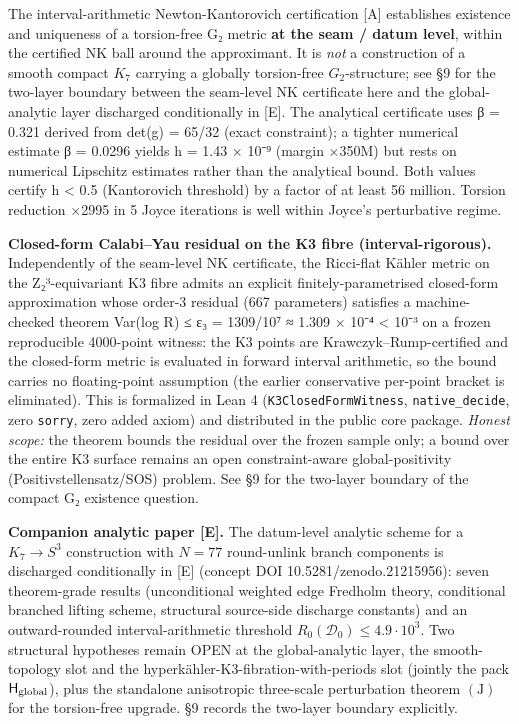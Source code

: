 \documentclass[11pt,a4paper]{article}
\begin{document}
The interval-arithmetic Newton-Kantorovich certification {[}A{]} establishes existence and uniqueness of a torsion-free G₂ metric \textbf{at the seam / datum level}, within the certified NK ball around the approximant. It is \emph{not} a construction of a smooth compact \(K_7\) carrying a globally torsion-free \(G_2\)-structure; see §9 for the two-layer boundary between the seam-level NK certificate here and the global-analytic layer discharged conditionally in {[}E{]}. The analytical certificate uses β = 0.321 derived from det(g) = 65/32 (exact constraint); a tighter numerical estimate β = 0.0296 yields h = 1.43 × 10⁻⁹ (margin ×350M) but rests on numerical Lipschitz estimates rather than the analytical bound. Both values certify h \textless{} 0.5 (Kantorovich threshold) by a factor of at least 56 million. Torsion reduction ×2995 in 5 Joyce iterations is well within Joyce's perturbative regime.

\textbf{Closed-form Calabi--Yau residual on the K3 fibre (interval-rigorous).} Independently of the seam-level NK certificate, the Ricci-flat Kähler metric on the Z₂³-equivariant K3 fibre admits an explicit finitely-parametrised closed-form approximation whose order-3 residual (667 parameters) satisfies a machine-checked theorem Var(log R) ≤ ε₃ = 1309/10⁷ ≈ 1.309 × 10⁻⁴ \textless{} 10⁻³ on a frozen reproducible 4000-point witness: the K3 points are Krawczyk--Rump-certified and the closed-form metric is evaluated in forward interval arithmetic, so the bound carries no floating-point assumption (the earlier conservative per-point bracket is eliminated). This is formalized in Lean 4 (\texttt{K3Closed\allowbreak{}Form\allowbreak{}Witness}, \texttt{native\_\allowbreak{}decide}, zero \texttt{sorry}, zero added axiom) and distributed in the public core package. \emph{Honest scope:} the theorem bounds the residual over the frozen sample only; a bound over the entire K3 surface remains an open constraint-aware global-positivity (Positivstellensatz/SOS) problem. See §9 for the two-layer boundary of the compact G₂ existence question.

\textbf{Companion analytic paper {[}E{]}.} The datum-level analytic scheme for a \(K_7 \to S^3\) construction with \(N = 77\) round-unlink branch components is discharged conditionally in {[}E{]} (concept DOI 10.5281/zenodo.21215956): seven theorem-grade results (unconditional weighted edge Fredholm theory, conditional branched lifting scheme, structural source-side discharge constants) and an outward-rounded interval-arithmetic threshold \(R_0(\mathcal D_0) \le 4.9 \cdot 10^3\). Two structural hypotheses remain OPEN at the global-analytic layer, the smooth-topology slot and the hyperkähler-K3-fibration-with-periods slot (jointly the pack \(\mathsf H_{\rm global}\)), plus the standalone anisotropic three-scale perturbation theorem \((\mathrm J)\) for the torsion-free upgrade. §9 records the two-layer boundary explicitly.
\end{document}
